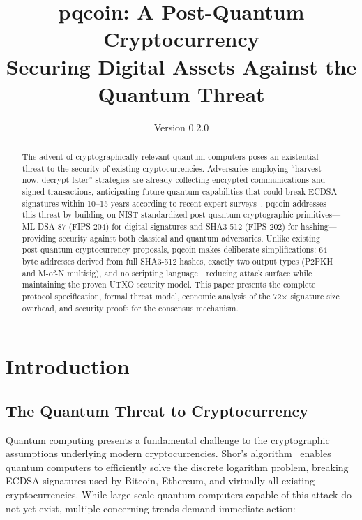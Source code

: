 \documentclass[11pt,a4paper]{article}
\title{\textbf{pqcoin: A Post-Quantum Cryptocurrency}\\[0.5em]\large Securing Digital Assets Against the Quantum Threat}
\author{Version 0.2.0}
\date{}
\begin{document}
\maketitle

\begin{abstract}
The advent of cryptographically relevant quantum computers poses an existential threat to the security of existing cryptocurrencies. Adversaries employing ``harvest now, decrypt later'' strategies are already collecting encrypted communications and signed transactions, anticipating future quantum capabilities that could break ECDSA signatures within 10--15 years according to recent expert surveys~\cite{mosca2022}. pqcoin addresses this threat by building on NIST-standardized post-quantum cryptographic primitives---ML-DSA-87 (FIPS 204) for digital signatures and SHA3-512 (FIPS 202) for hashing---providing security against both classical and quantum adversaries. Unlike existing post-quantum cryptocurrency proposals, pqcoin makes deliberate simplifications: 64-byte addresses derived from full SHA3-512 hashes, exactly two output types (P2PKH and M-of-N multisig), and no scripting language---reducing attack surface while maintaining the proven UTXO security model. This paper presents the complete protocol specification, formal threat model, economic analysis of the 72$\times$ signature size overhead, and security proofs for the consensus mechanism.
\end{abstract}

\tableofcontents
\newpage

\section{Introduction}

\subsection{The Quantum Threat to Cryptocurrency}

Quantum computing presents a fundamental challenge to the cryptographic assumptions underlying modern cryptocurrencies. Shor's algorithm~\cite{shor1994} enables quantum computers to efficiently solve the discrete logarithm problem, breaking ECDSA signatures used by Bitcoin, Ethereum, and virtually all existing cryptocurrencies. While large-scale quantum computers capable of this attack do not yet exist, multiple concerning trends demand immediate action:
\end{document}
